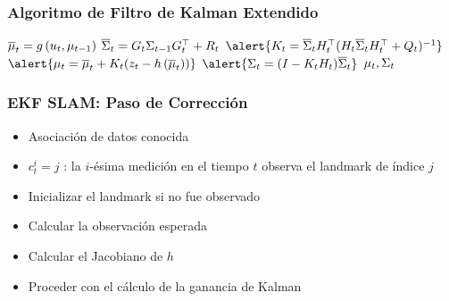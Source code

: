 \begin{frame}
    \frametitle{Algoritmo de Filtro de Kalman Extendido}
    
    \begin{algorithmic}[1]
        \State $\overline{\mu}_{t} = g\left( u_{t}, \mu_{t-1} \right)$
        \State $\overline{\Sigma}_{t} = G_{t} \Sigma_{t-1} G_{t}^{\top}+R_{t}$
        \Statex
        \State $\alert{\kalmanGain_{t} = \overline{\covariance}_{t} \observationModelJacobian_{t}^{\top} (\observationModelJacobian_{t} \overline{\covariance}_{t}  \observationModelJacobian_{t}^{\top} + \observationModelCovariance_{t})^{-1}}$
        \State $\alert{\mu_{t} = \overline{\mu}_{t} + \kalmanGain_{t} (\observation_{t} - \observationModelFunction{\overline{\mu}_{t}})}$
        \State $\alert{\covariance_{t} =  (I - \kalmanGain_{t} \observationModelJacobian_{t}) \overline{\covariance}_{t}}$
        \State \Return $\mu_{t}, \Sigma_{t}$
    \EndProcedure
    \end{algorithmic}
\end{frame}

\begin{frame}
    \frametitle{EKF SLAM: Paso de Corrección}

    \begin{itemize}
        \item Asociación de datos conocida
        \item $c_{t}^{i} = j$ : la $i$-ésima medición en el tiempo $t$ observa el landmark de índice $j$
        \item Inicializar el landmark si no fue observado
        \item Calcular la observación esperada
        \item Calcular el Jacobiano de $h$
        \item Proceder con el cálculo de la ganancia de Kalman
    \end{itemize}

\end{frame}

